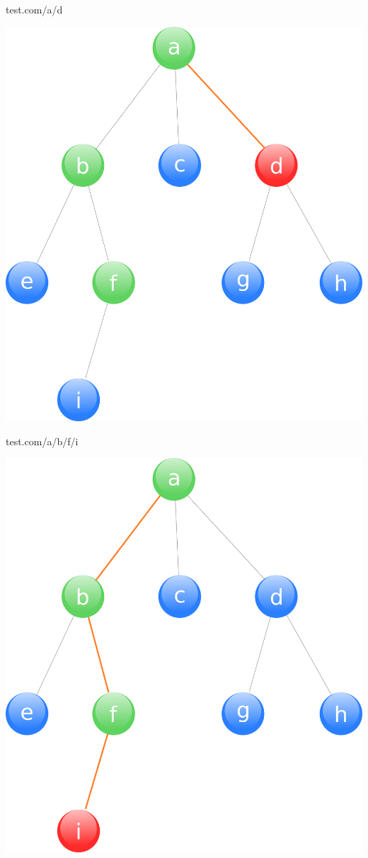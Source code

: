 \documentclass[arial,pdftex]{beamer}
\begin{document}
\begin{frame}
  \hfill test.com/a/d
  \begin{center}\includegraphics[height=0.8\textheight]{tree-ad.pdf}\end{center}
\end{frame}

\begin{frame}
  \hfill test.com/a/b/f/i
  \begin{center}\includegraphics[height=0.8\textheight]{tree-abfi.pdf}\end{center}
\end{frame}
\end{document}
